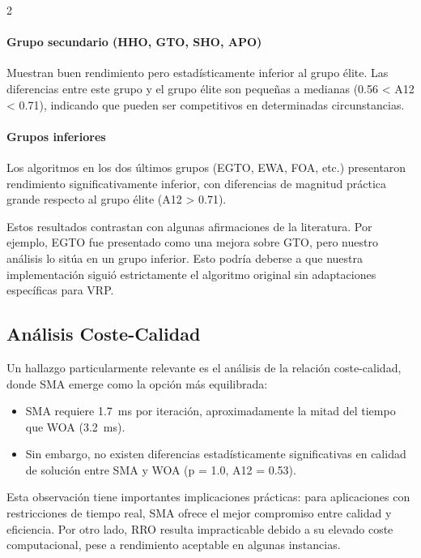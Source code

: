 \documentclass[10pt,a4paper]{extarticle}
\begin{document}
\begin{table}[!htbp]
\begin{multicols}{2}
\paragraph{Grupo secundario (HHO, GTO, SHO, APO)} Muestran buen rendimiento pero estadísticamente inferior al grupo élite. Las diferencias entre este grupo y el grupo élite son pequeñas a medianas (0.56 < A12 < 0.71), indicando que pueden ser competitivos en determinadas circunstancias.

\paragraph{Grupos inferiores} Los algoritmos en los dos últimos grupos (EGTO, EWA, FOA, etc.) presentaron rendimiento significativamente inferior, con diferencias de magnitud práctica grande respecto al grupo élite (A12 > 0.71).

Estos resultados contrastan con algunas afirmaciones de la literatura. Por ejemplo, EGTO \cite{Hassan2024EGTO} fue presentado como una mejora sobre GTO, pero nuestro análisis lo sitúa en un grupo inferior. Esto podría deberse a que nuestra implementación siguió estrictamente el algoritmo original sin adaptaciones específicas para VRP.

\subsection{Análisis Coste-Calidad}
Un hallazgo particularmente relevante es el análisis de la relación coste-calidad, donde SMA emerge como la opción más equilibrada:
\begin{itemize}
\item SMA requiere \SI{1.7}{\milli\second} por iteración, aproximadamente la mitad del tiempo que WOA (\SI{3.2}{\milli\second}).
\item Sin embargo, no existen diferencias estadísticamente significativas en calidad de solución entre SMA y WOA (p = 1.0, A12 = 0.53).
\end{itemize}

Esta observación tiene importantes implicaciones prácticas: para aplicaciones con restricciones de tiempo real, SMA ofrece el mejor compromiso entre calidad y eficiencia. Por otro lado, RRO resulta impracticable debido a su elevado coste computacional, pese a rendimiento aceptable en algunas instancias.


\end{multicols}
\end{table}
\end{document}
